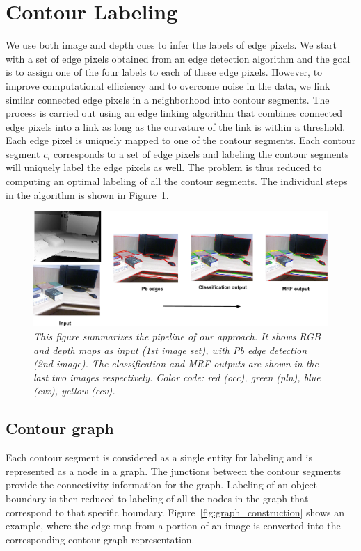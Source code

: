\section{Contour Labeling}

We use both image and depth cues to infer the labels of edge pixels. We start with a set 
of edge pixels obtained from an edge detection algorithm and the goal is to assign one 
of the four labels to each of these edge pixels. However, to improve computational efficiency 
and to overcome noise in the data, we link similar connected edge pixels in a neighborhood 
into contour segments. The process is carried out using an edge linking algorithm that 
combines connected edge pixels into a link as long as the curvature of the link is within 
a threshold. Each edge pixel is uniquely mapped to one of the contour segments. Each contour 
segment $c_i$ corresponds to a set of edge pixels and labeling the contour segments will 
uniquely label the edge pixels as well. The problem is thus reduced to computing an optimal 
labeling of all the contour segments. 
The individual steps in the algorithm is shown in Figure~\ref{fig:pipeline}.
\begin{figure}[t]
\centering
\includegraphics[width=1.0\linewidth]{pipeline_abstract.pdf}
\caption{\it This figure summarizes the pipeline of our approach. It shows RGB and depth maps 
as input (1st image set), with Pb edge detection~\cite{martin2004} (2nd image). The classification and MRF 
outputs are shown in the last two images respectively. Color code: red (occ), green (pln), 
blue (cvx), yellow (ccv).}
\vspace{-2mm}
\label{fig:pipeline}
\end{figure}

\subsection{Contour graph}

Each contour segment is considered as a single entity for 
labeling and is represented as a node in a graph. The junctions between the contour 
segments provide the connectivity information for the graph. Labeling of an object 
boundary is then reduced to labeling of all the nodes in the graph that correspond to 
that specific boundary. Figure~\ref{fig:graph_construction} shows an example, where 
the edge map from a portion of an image is converted into the corresponding contour
graph representation.

